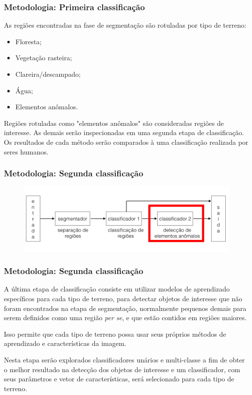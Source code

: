 \documentclass[t]{beamer}
\begin{document}
\begin{frame}
	\frametitle{Metodologia: Primeira classificação}

	As regiões encontradas na fase de segmentação são rotuladas por tipo de terreno:

	\begin{itemize}
		\item Floresta;
		\item Vegetação rasteira;
		\item Clareira/descampado;
		\item Água;
		\item Elementos anômalos.
	\end{itemize}

	\vspace{0.5cm}

	Regiões rotuladas como "elementos anômalos" são consideradas regiões de interesse. As demais serão inspecionadas em uma segunda etapa de classificação. Os resultados de cada método serão comparados à uma classificação realizada por seres humanos.

\end{frame}

\begin{frame}[c]
	\frametitle{Metodologia: Segunda classificação}
	\begin{figure}[h]
    	\includegraphics[width=\textwidth]{imgs/arquitetura_3}
	\end{figure}
\end{frame}

\begin{frame}
	\frametitle{Metodologia: Segunda classificação}

	A última etapa de classificação consiste em utilizar modelos de aprendizado específicos para cada tipo de terreno, para detectar objetos de interesse que não foram encontrados na etapa de segmentação, normalmente pequenos demais para serem definidos como uma região \textit{per se}, e que estão contidos em regiões maiores.
	
	\vspace{0.5cm} 
	
	Isso permite que cada tipo de terreno possa usar seus próprios métodos de aprendizado e características da imagem.
	
	\vspace{0.5cm}
	
	Nesta etapa serão explorados classificadores unários e multi-classe a fim de obter o melhor resultado na detecção dos objetos de interesse e um classificador, com seus parâmetros e vetor de características, será selecionado para cada tipo de terreno.
\end{frame}
\end{document}
